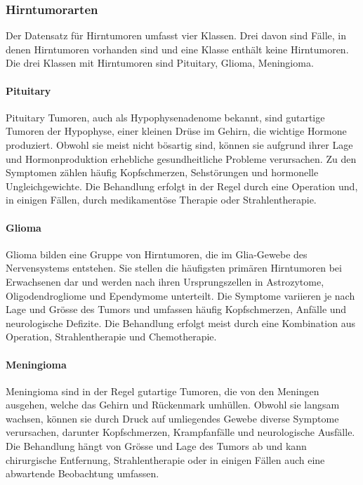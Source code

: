 \newpage

\subsubsection{Hirntumorarten} \label{chap:brain-hirnarten-datensatz}
Der Datensatz für Hirntumoren umfasst vier Klassen. Drei davon sind Fälle, in denen Hirntumoren vorhanden sind und eine Klasse enthält keine Hirntumoren. Die drei Klassen mit Hirntumoren sind Pituitary, Glioma, Meningioma.

\paragraph{Pituitary} \label{chap:brain-pituitary}
Pituitary Tumoren, auch als Hypophysenadenome bekannt, sind gutartige Tumoren der Hypophyse, einer kleinen Drüse im Gehirn, die wichtige Hormone produziert. Obwohl sie meist nicht bösartig sind, können sie aufgrund ihrer Lage und Hormonproduktion erhebliche gesundheitliche Probleme verursachen. Zu den Symptomen zählen häufig Kopfschmerzen, Sehstörungen und hormonelle Ungleichgewichte. Die Behandlung erfolgt in der Regel durch eine Operation und, in einigen Fällen, durch medikamentöse Therapie oder Strahlentherapie.

\paragraph{Glioma} \label{chap:brain-gliome}
Glioma bilden eine Gruppe von Hirntumoren, die im Glia-Gewebe des Nervensystems entstehen. Sie stellen die häufigsten primären Hirntumoren bei Erwachsenen dar und werden nach ihren Ursprungszellen in Astrozytome, Oligodendrogliome und Ependymome unterteilt. Die Symptome variieren je nach Lage und Grösse des Tumors und umfassen häufig Kopfschmerzen, Anfälle und neurologische Defizite. Die Behandlung erfolgt meist durch eine Kombination aus Operation, Strahlentherapie und Chemotherapie.

\paragraph{Meningioma} \label{chap:brain-meningioma}
Meningioma sind in der Regel gutartige Tumoren, die von den Meningen ausgehen, welche das Gehirn und Rückenmark umhüllen. Obwohl sie langsam wachsen, können sie durch Druck auf umliegendes Gewebe diverse Symptome verursachen, darunter Kopfschmerzen, Krampfanfälle und neurologische Ausfälle. Die Behandlung hängt von Grösse und Lage des Tumors ab und kann chirurgische Entfernung, Strahlentherapie oder in einigen Fällen auch eine abwartende Beobachtung umfassen. 

